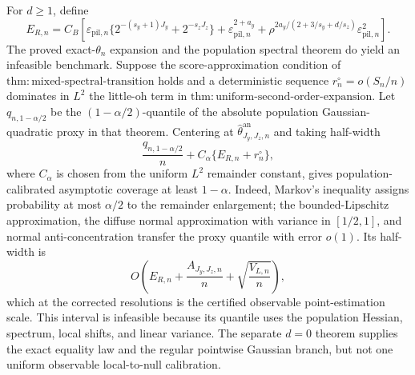For \(d\ge1\), define
\[
E_{R,n}=C_B\left[
\varepsilon_{\mathrm{pil},n}\{2^{-(s_y+1)J_y}+2^{-s_zJ_z}\}
+\varepsilon_{\mathrm{pil},n}^{2+a_y}
+\rho^{2a_y/(2+3/s_y+d/s_z)}\varepsilon_{\mathrm{pil},n}^2
\right].
\]
The proved exact-\(\theta_n\) expansion and the population spectral theorem do yield an infeasible benchmark. Suppose the score-approximation condition of \(\mathrm{thm{:}mixed\text{-}spectral\text{-}transition}\) holds and a deterministic sequence \(r_n^{\circ}=o(S_n/n)\) dominates in \(L^2\) the little-oh term in \(\mathrm{thm{:}uniform\text{-}second\text{-}order\text{-}expansion}\). Let \(q_{n,1-\alpha/2}\) be the \((1-\alpha/2)\)-quantile of the absolute population Gaussian-quadratic proxy in that theorem. Centering at \(\widehat\theta^{\mathrm{an}}_{J_y,J_z,n}\) and taking half-width
\[
\frac{q_{n,1-\alpha/2}}{n}+C_\alpha\{E_{R,n}+r_n^{\circ}\},
\]
where \(C_\alpha\) is chosen from the uniform \(L^2\) remainder constant, gives population-calibrated asymptotic coverage at least \(1-\alpha\). Indeed, Markov's inequality assigns probability at most \(\alpha/2\) to the remainder enlargement; the bounded-Lipschitz approximation, the diffuse normal approximation with variance in \([1/2,1]\), and normal anti-concentration transfer the proxy quantile with error \(o(1)\). Its half-width is
\[
O\!\left(E_{R,n}+\frac{A_{J_y,J_z,n}}n+\sqrt{\frac{V_{L,n}}n}\right),
\]
which at the corrected resolutions is the certified observable point-estimation scale. This interval is infeasible because its quantile uses the population Hessian, spectrum, local shifts, and linear variance. The separate \(d=0\) theorem supplies the exact equality law and the regular pointwise Gaussian branch, but not one uniform observable local-to-null calibration.